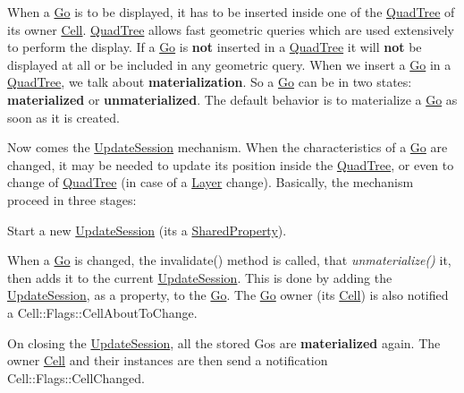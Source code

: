 When a \hyperlink{classHurricane_1_1Go}{Go} is to be displayed, it has to be inserted inside one of the \hyperlink{classHurricane_1_1QuadTree}{Quad\+Tree} of it\textquotesingle{}s owner \hyperlink{classHurricane_1_1Cell}{Cell}. \hyperlink{classHurricane_1_1QuadTree}{Quad\+Tree} allows fast geometric queries which are used extensively to perform the display. If a \hyperlink{classHurricane_1_1Go}{Go} is {\bfseries not} inserted in a \hyperlink{classHurricane_1_1QuadTree}{Quad\+Tree} it will {\bfseries not} be displayed at all or be included in any geometric query. When we insert a \hyperlink{classHurricane_1_1Go}{Go} in a \hyperlink{classHurricane_1_1QuadTree}{Quad\+Tree}, we talk about {\bfseries materialization}. So a \hyperlink{classHurricane_1_1Go}{Go} can be in two states\+: {\bfseries materialized} or {\bfseries unmaterialized}. The default behavior is to materialize a \hyperlink{classHurricane_1_1Go}{Go} as soon as it is created.

Now comes the \hyperlink{classHurricane_1_1UpdateSession}{Update\+Session} mechanism. When the characteristics of a \hyperlink{classHurricane_1_1Go}{Go} are changed, it may be needed to update it\textquotesingle{}s position inside the \hyperlink{classHurricane_1_1QuadTree}{Quad\+Tree}, or even to change of \hyperlink{classHurricane_1_1QuadTree}{Quad\+Tree} (in case of a \hyperlink{classHurricane_1_1Layer}{Layer} change). Basically, the mechanism proceed in three stages\+:


\begin{DoxyItemize}
\item Start a new \hyperlink{classHurricane_1_1UpdateSession}{Update\+Session} (it\textquotesingle{}s a \hyperlink{classHurricane_1_1SharedProperty}{Shared\+Property}).
\item When a \hyperlink{classHurricane_1_1Go}{Go} is changed, the {\ttfamily invalidate()} method is called, that {\itshape unmaterialize()} it, then adds it to the current \hyperlink{classHurricane_1_1UpdateSession}{Update\+Session}. This is done by adding the \hyperlink{classHurricane_1_1UpdateSession}{Update\+Session}, as a property, to the \hyperlink{classHurricane_1_1Go}{Go}. The \hyperlink{classHurricane_1_1Go}{Go} owner (it\textquotesingle{}s \hyperlink{classHurricane_1_1Cell}{Cell}) is also notified a {\ttfamily Cell\+::\+Flags\+::\+Cell\+About\+To\+Change}.
\item On closing the \hyperlink{classHurricane_1_1UpdateSession}{Update\+Session}, all the stored Gos are {\bfseries materialized} again. The owner \hyperlink{classHurricane_1_1Cell}{Cell} and their instances are then send a notification {\ttfamily Cell\+::\+Flags\+::\+Cell\+Changed}.
\end{DoxyItemize}

